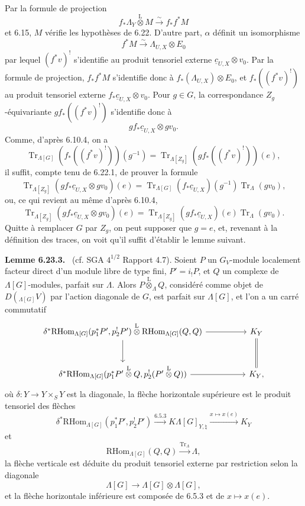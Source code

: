 \documentclass[11pt]{article}
\newenvironment{statement}[1]{\par\medskip\noindent\textbf{#1.}\ }{\par\medskip}
\providecommand{\RHom}{\mathrm{RHom}}
\providecommand{\Tr}{\operatorname{Tr}}
\providecommand{\Tr}{\operatorname{Tr}}
\providecommand{\lten}{\overset{\mathrm L}{\otimes}}
\providecommand{\Tr}{\operatorname{Tr}}
\providecommand{\RHom}{\mathrm{RHom}}
\providecommand{\lten}{\overset{\mathrm L}{\otimes}}
\providecommand{\RHom}{\mathrm R\mathcal{H}om}
\providecommand{\lten}{\overset{\mathrm L}{\otimes}}
\providecommand{\Tr}{\operatorname{Tr}}
\providecommand{\lten}{\overset{\mathrm L}{\otimes}}
\providecommand{\lten}{\overset{\mathrm L}{\otimes}}
\providecommand{\lten}{\overset{\mathrm L}{\otimes}}
\providecommand{\RHom}{\mathrm{RHom}}
\providecommand{\Tr}{\operatorname{Tr}}
\providecommand{\lten}{\overset{\mathrm L}{\otimes}}
\begin{document}
Par la formule de projection
\[
f_*\Lambda_Y\lten M\xrightarrow{\sim}f_*f^*M
\]
et 6.15, $M$ vérifie les hypothèses de 6.22. D'autre part, $\alpha$ définit un isomorphisme
\[
f^*M\xrightarrow{\sim}\Lambda_{U,X}\otimes E_0
\]
par lequel $(f^*v)^!$ s'identifie au produit tensoriel externe $\underline c_{U,X}\otimes v_0$. Par la formule de projection, $f_*f^*M$ s'identifie donc à $f_*(\Lambda_{U,X})\otimes E_0$, et $f_*((f^*v)^!)$ au produit tensoriel externe $f_*\underline c_{U,X}\otimes v_0$. Pour $g\in G$, la correspondance $Z_g$-équivariante $gf_*((f^*v)^!)$ s'identifie donc à
\[
gf_*\underline c_{U,X}\otimes gv_0.
\]
Comme, d'après 6.10.4, on a
\[
\Tr_{\Lambda[G]}(f_*((f^*v)^!))(g^{-1})
=
\Tr_{\Lambda[Z_g]}(gf_*((f^*v)^!))(e),
\]
il suffit, compte tenu de 6.22.1, de prouver la formule
\[
\Tr_{\Lambda[Z_g]}(gf_*\underline c_{U,X}\otimes gv_0)(e)
=
\Tr_{\Lambda[G]}(f_*\underline c_{U,X})(g^{-1})\Tr_{\Lambda}(gv_0),
\]
ou, ce qui revient au même d'après 6.10.4,
\begin{equation}
\Tr_{\Lambda[Z_g]}(gf_*\underline c_{U,X}\otimes gv_0)(e)
=
\Tr_{\Lambda[Z_g]}(gf_*\underline c_{U,X})(e)\Tr_{\Lambda}(gv_0).
\tag{6.23.2}
\end{equation}
Quitte à remplacer $G$ par $Z_g$, on peut supposer que $g=e$, et, revenant à la définition des traces, on voit qu'il suffit d'établir le lemme suivant.

\begin{statement}{Lemme 6.23.3}
(cf. SGA $4^{1/2}$ Rapport 4.7). Soient $P$ un $G_V$-module localement facteur direct d'un module libre de type fini, $P'=i_!P$, et $Q$ un complexe de $\Lambda[G]$-modules, parfait sur $\Lambda$. Alors $P\lten_{\Lambda}Q$, considéré comme objet de $D({}_{\Lambda[G]}V)$ par l'action diagonale de $G$, est parfait sur $\Lambda[G]$, et l'on a un carré commutatif
\[
\begin{tikzcd}[column sep=huge,row sep=large]
\delta^*\RHom_{\Lambda[G]}(p_1^*P',p_2^!P')\lten
\RHom_{\Lambda[G]}(Q,Q) \arrow[r] \arrow[d]
& K_Y \arrow[d,equal]\\
\delta^*\RHom_{\Lambda[G]}(p_1^*P'\lten Q,p_2^!(P'\lten Q)) \arrow[r]
& K_Y ,
\end{tikzcd}
\]
où $\delta:Y\to Y\times_SY$ est la diagonale, la flèche horizontale supérieure est le produit tensoriel des flèches
\[
\delta^*\RHom_{\Lambda[G]}(p_1^*P',p_2^!P')\xrightarrow{6.5.3}
K\Lambda[G]_{Y,\natural}\xrightarrow{x\mapsto x(e)}K_Y
\]
et
\[
\RHom_{\Lambda[G]}(Q,Q)\xrightarrow{\Tr_{\Lambda}}\Lambda,
\]
la flèche verticale est déduite du produit tensoriel externe par restriction selon la diagonale
\[
\Lambda[G]\to\Lambda[G]\otimes\Lambda[G],
\]
et la flèche horizontale inférieure est composée de 6.5.3 et de $x\mapsto x(e)$.
\end{statement}
\end{document}
